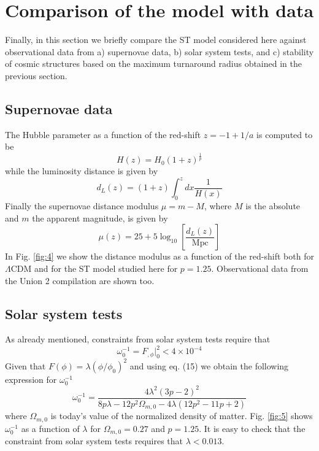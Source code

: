 \section{Comparison of the model with data}\label{data_comparison}

Finally, in this section we briefly compare the ST model considered here against observational data from a) supernovae data, b) solar system tests, and c) stability of cosmic structures based on the maximum turnaround radius obtained in the previous section.


\subsection{Supernovae data}

The Hubble parameter as a function of the red-shift $z=-1+1/a$ is computed to be
\begin{equation}
H(z) = H_0 (1+z)^{\frac{1}{p}}
\end{equation}
while the luminosity distance is given by \cite{hogg}
\begin{equation}
d_L(z) = (1+z) \int_0^z dx \frac{1}{H(x)} 
\end{equation}
Finally the supernovae distance modulus $\mu = m-M$, where $M$ is the absolute and $m$ the apparent magnitude, is given by \cite{copeland,nesseris}
\begin{equation}
\mu(z) = 25 + 5 \log_{10} \left[ \frac{d_L(z)}{\text{Mpc}} \right]
\end{equation}
In Fig. \ref{fig:4} we show the distance modulus as a function of the red-shift both
for $\Lambda$CDM and for the ST model studied here for $p=1.25$. Observational data from the Union 2 compilation \cite{union2} are shown too.


\subsection{Solar system tests}
 As already mentioned, constraints from solar system tests require that \cite{leandros1}
\begin{equation}
\omega_0^{-1} = F_{,\phi}|_0^2 < 4 \times 10^{-4}
\end{equation}
Given that $F(\phi) = \lambda (\phi/\phi_0)^2$ and using eq. (15) we obtain the following expression for $\omega_0^{-1}$
\begin{equation}
\omega_0^{-1} = \frac{4 \lambda^2 (3p-2)^2}{8p \lambda-12 p^2 \Omega_{m,0}-4 \lambda (12p^2-11p+2)}
\end{equation}
where $\Omega_{m,0}$ is today's value of the normalized density of matter.
Fig. \ref{fig:5} shows $\omega_0^{-1}$ as a function of $\lambda$ for $\Omega_{m,0}=0.27$ and $p=1.25$. It is easy to check that the constraint from solar system tests requires that $\lambda < 0.013$. 

